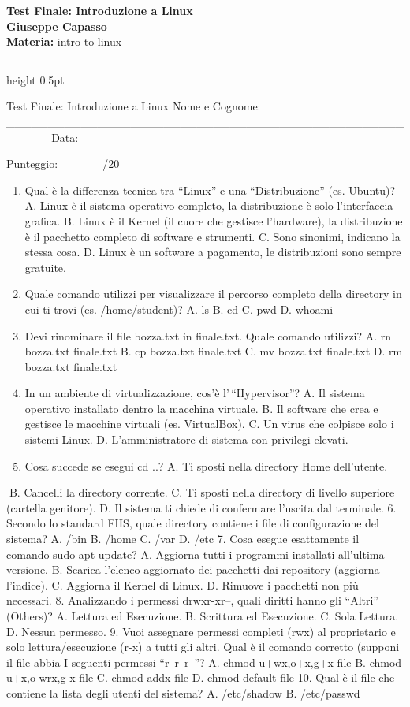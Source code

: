 \documentclass[11pt,a4paper]{article}
\providecommand{\tightlist}{%
  \setlength{\itemsep}{0pt}\setlength{\parskip}{0pt}}
\newcommand{\proposaltitle}[1]{
    \begin{center}
        \vspace*{0.1cm}
        {\LARGE \bfseries \color{blue} #1} \\[1.5ex]
        {\large \textbf{Giuseppe Capasso}} \\[1ex]
                \small{
            \vspace{0.1cm}
            \textbf{Materia:} intro-to-linux\\
        }
            \end{center}
    \vspace{0.3cm}
    \hrule height 0.5pt
    \vspace{0.5cm}
}
\begin{document}
\proposaltitle{Test Finale: Introduzione a Linux}

Test Finale: Introduzione a Linux Nome e Cognome:
\_\_\_\_\_\_\_\_\_\_\_\_\_\_\_\_\_\_\_\_\_\_\_\_\_\_\_\_\_\_\_\_\_\_\_\_\_\_\_\_\_\_\_\_\_\_\_\_\_\_\_\_\_
Data: \_\_\_\_\_\_\_\_\_\_\_\_\_\_\_\_\_\_\_

Punteggio: \_\_\_\_\_/20

\begin{enumerate}
\def\labelenumi{\arabic{enumi}.}
\tightlist
\item
  Qual è la differenza tecnica tra ``Linux'' e una ``Distribuzione''
  (es. Ubuntu)? A. Linux è il sistema operativo completo, la
  distribuzione è solo l'interfaccia grafica. B. Linux è il Kernel (il
  cuore che gestisce l'hardware), la distribuzione è il pacchetto
  completo di software e strumenti. C. Sono sinonimi, indicano la stessa
  cosa. D. Linux è un software a pagamento, le distribuzioni sono sempre
  gratuite.
\item
  Quale comando utilizzi per visualizzare il percorso completo della
  directory in cui ti trovi (es. /home/student)? A. ls B. cd C. pwd D.
  whoami
\item
  Devi rinominare il file bozza.txt in finale.txt. Quale comando
  utilizzi? A. rn bozza.txt finale.txt B. cp bozza.txt finale.txt C. mv
  bozza.txt finale.txt D. rm bozza.txt finale.txt
\item
  In un ambiente di virtualizzazione, cos'è l'\,``Hypervisor''? A. Il
  sistema operativo installato dentro la macchina virtuale. B. Il
  software che crea e gestisce le macchine virtuali (es. VirtualBox). C.
  Un virus che colpisce solo i sistemi Linux. D. L'amministratore di
  sistema con privilegi elevati.
\item
  Cosa succede se esegui cd ..? A. Ti sposti nella directory Home
  dell'utente.
\end{enumerate}

B. Cancelli la directory corrente. C. Ti sposti nella directory di
livello superiore (cartella genitore). D. Il sistema ti chiede di
confermare l'uscita dal terminale. 6. Secondo lo standard FHS, quale
directory contiene i file di configurazione del sistema? A. /bin B.
/home C. /var D. /etc 7. Cosa esegue esattamente il comando sudo apt
update? A. Aggiorna tutti i programmi installati all'ultima versione. B.
Scarica l'elenco aggiornato dei pacchetti dai repository (aggiorna
l'indice). C. Aggiorna il Kernel di Linux. D. Rimuove i pacchetti non
più necessari. 8. Analizzando i permessi drwxr-xr--, quali diritti hanno
gli ``Altri'' (Others)? A. Lettura ed Esecuzione. B. Scrittura ed
Esecuzione. C. Sola Lettura. D. Nessun permesso. 9. Vuoi assegnare
permessi completi (rwx) al proprietario e solo lettura/esecuzione (r-x)
a tutti gli altri. Qual è il comando corretto (supponi il file abbia I
seguenti permessi ``r--r--r--''? A. chmod u+wx,o+x,g+x file B. chmod
u+x,o-wrx,g-x file C. chmod addx file D. chmod default file 10. Qual è
il file che contiene la lista degli utenti del sistema? A. /etc/shadow
B. /etc/passwd
\end{document}
